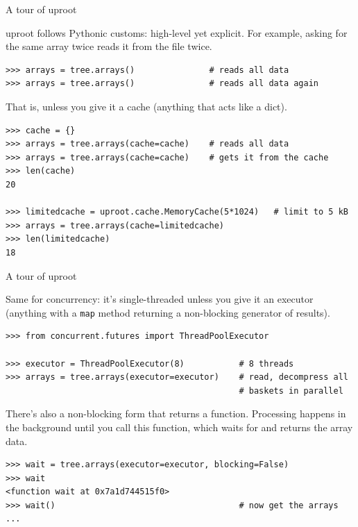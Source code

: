 \documentclass[aspectratio=169]{beamer}
\begin{document}
\begin{frame}[fragile]{A tour of uproot}
\vspace{0.5 cm}
\small

{\normalsize uproot follows Pythonic customs: high-level yet explicit. For example, asking for the same array twice reads it from the file twice.}

\begin{verbatim}
>>> arrays = tree.arrays()               # reads all data
>>> arrays = tree.arrays()               # reads all data again
\end{verbatim}

\vspace{0.2 cm}
{\normalsize That is, unless you give it a cache (anything that acts like a dict).}

\begin{verbatim}
>>> cache = {}
>>> arrays = tree.arrays(cache=cache)    # reads all data
>>> arrays = tree.arrays(cache=cache)    # gets it from the cache
>>> len(cache)
20

>>> limitedcache = uproot.cache.MemoryCache(5*1024)   # limit to 5 kB
>>> arrays = tree.arrays(cache=limitedcache)
>>> len(limitedcache)
18
\end{verbatim}
\end{frame}

\begin{frame}[fragile]{A tour of uproot}
\label{page:executor}\vspace{0.5 cm}
\small

{\normalsize Same for concurrency: it's single-threaded unless you give it an executor (anything with a {\tt\small map} method returning a non-blocking generator of results).}

\begin{verbatim}
>>> from concurrent.futures import ThreadPoolExecutor

>>> executor = ThreadPoolExecutor(8)           # 8 threads
>>> arrays = tree.arrays(executor=executor)    # read, decompress all
                                               # baskets in parallel
\end{verbatim}

\vspace{0.2 cm}
{\normalsize There's also a non-blocking form that returns a function. Processing happens in the background until you call this function, which waits for and returns the array data.}

\begin{verbatim}
>>> wait = tree.arrays(executor=executor, blocking=False)
>>> wait
<function wait at 0x7a1d744515f0>
>>> wait()                                     # now get the arrays
...
\end{verbatim}
\end{frame}
\end{document}
